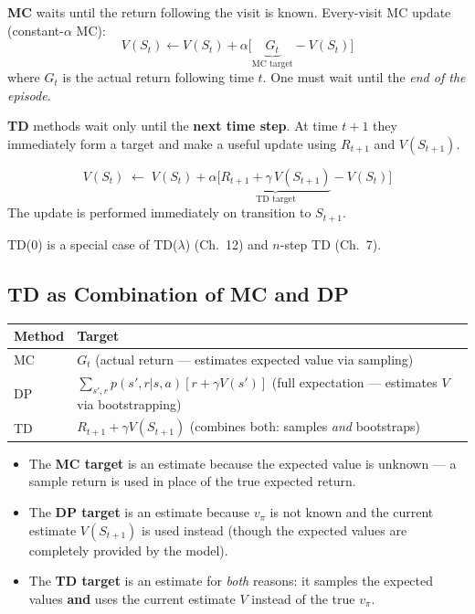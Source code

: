 \documentclass[11pt,a4paper]{article}
\theoremstyle{definition}
\theoremstyle{plain}
\theoremstyle{remark}
\begin{document}
\textbf{MC} waits until the return following the visit is known. Every-visit MC update (constant-$\alpha$ MC):
\[
    V(S_t) \leftarrow V(S_t) + \alpha\bigl[\underbrace{G_t}_{\text{MC target}} - V(S_t)\bigr]
\]
where $G_t$ is the actual return following time $t$. One must wait until the \textit{end of the episode}.

\textbf{TD} methods wait only until the \textbf{next time step}. At time $t+1$ they immediately form a target and make a useful update using $R_{t+1}$ and $V(S_{t+1})$.

\begin{tcolorbox}[colback=green!5!white, colframe=green!60!black, title={TD(0) Update Rule (One-Step TD)}]
\[
    V(S_t) \;\leftarrow\; V(S_t) + \alpha\bigl[\underbrace{R_{t+1} + \gamma\, V(S_{t+1})}_{\text{TD target}} - V(S_t)\bigr]
\]
The update is performed immediately on transition to $S_{t+1}$.
\end{tcolorbox}

TD(0) is a special case of TD($\lambda$) (Ch.\ 12) and $n$-step TD (Ch.\ 7).

\subsection{TD as Combination of MC and DP}

\begin{center}
\begin{tabular}{ll}
\hline
\textbf{Method} & \textbf{Target} \\
\hline
MC  & $G_t$ (actual return — estimates expected value via sampling) \\
DP  & $\sum_{s',r} p(s',r|s,a)[r + \gamma V(s')]$ (full expectation — estimates $V$ via bootstrapping) \\
TD  & $R_{t+1} + \gamma V(S_{t+1})$ (combines both: samples \textit{and} bootstraps) \\
\hline
\end{tabular}
\end{center}

\begin{itemize}
    \item The \textbf{MC target} is an estimate because the expected value is unknown — a sample return is used in place of the true expected return.
    \item The \textbf{DP target} is an estimate because $v_\pi$ is not known and the current estimate $V(S_{t+1})$ is used instead (though the expected values are completely provided by the model).
    \item The \textbf{TD target} is an estimate for \textit{both} reasons: it samples the expected values \textbf{and} uses the current estimate $V$ instead of the true $v_\pi$.
\end{itemize}
\end{document}
